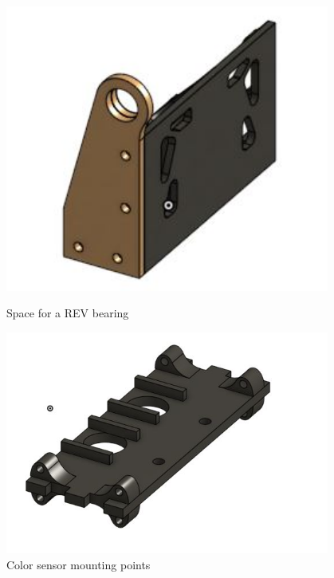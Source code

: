 \begin{figure}[ht]
\centering
\begin{minipage}[b]{.48\textwidth}
  \centering
  \includegraphics[width=0.95\textwidth]{Meetings/January/01-17-22/1-17-22_CAD_Figure1 - Nathan Forrer.JPG}
  \caption{Space for a REV bearing}
  \label{fig:011722_4}
\end{minipage}%
\hfill%
\begin{minipage}[b]{.48\textwidth}
  \centering
  \includegraphics[width=0.95\textwidth]{Meetings/January/01-17-22/1-17-22_CAD_Figure2 - Nathan Forrer.JPG}
  \caption{Color sensor mounting points}
  \label{fig:011722_5}
\end{minipage}
\end{figure}

